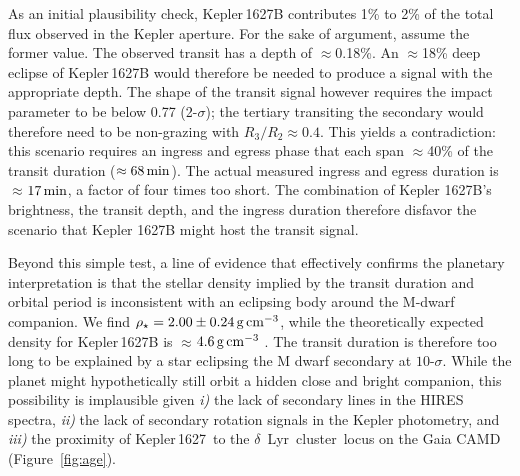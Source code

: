 \documentclass[12pt,modern,twocolumn,tighten,linenumbers]{aastex63}
\newcommand{\cn}{$\delta$\ Lyr\ cluster} %
\newcommand{\sn}{Kepler\,1627} %
\begin{document}

As an initial plausibility check, Kepler\,1627B contributes 1\% to 2\%
of the total flux observed in the Kepler aperture.  For the sake of
argument, assume the former value.  The observed transit has a depth
of $\approx$0.18\%.  An $\approx$18\% deep eclipse of Kepler\,1627B would
therefore be needed to produce a signal with the appropriate depth.
The shape of the transit signal however requires the impact parameter
to be below 0.77 (2-$\sigma$); the tertiary transiting the secondary
would therefore need to be non-grazing with $R_3/R_2 \approx 0.4$.
This yields a contradiction:  this scenario requires an ingress
and egress phase that each span $\approx$40\% of the transit duration
($\approx 68\,{\rm min}$).  The actual measured ingress and egress
duration is $\approx$$17\,{\rm min}$, a factor of four times too
short.  The combination of Kepler 1627B's brightness, the transit
depth, and the ingress duration therefore disfavor the scenario that
Kepler 1627B might host the transit signal.  

Beyond this simple test, a line of evidence that
effectively confirms the planetary interpretation is that the stellar density
implied by the transit duration and orbital period is inconsistent
with an eclipsing body around the M-dwarf companion.  We find
$\rho_\star = 2.00 \pm 0.24\,{\rm g\,cm}^{-3}$, while the
theoretically expected density for Kepler\,1627B  is $\approx$$4.6\,{\rm
g\,cm}^{-3}$ \citep{baraffe_new_2015}.
The transit duration is therefore too long to be explained by a star
eclipsing the M dwarf secondary at $10$-$\sigma$. While the planet
might hypothetically still orbit a hidden close and bright companion,
this possibility is implausible given {\it i)} the lack of secondary
lines in the HIRES spectra, {\it ii)} the lack of secondary
rotation signals in the Kepler photometry, and {\it iii)} the proximity
of \sn\ to the \cn\ locus on the Gaia CAMD (Figure~\ref{fig:age}).

\end{document}
